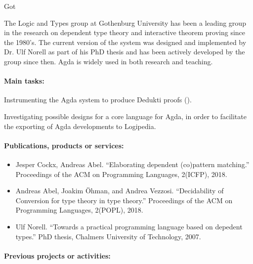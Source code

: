 \begin{sitedescription}{Got}

The Logic and Types group at Gothenburg University has been a leading group
in the research on dependent type theory and interactive theorem proving
since the 1980's. The current version of the system was designed and
implemented by Dr. Ulf Norell as part of his PhD thesis and has been
actively developed by the group since then. Agda is widely used in both
research and teaching.

\paragraph{Main tasks:}

\begin{compactitem}
\item Instrumenting the Agda system to produce Dedukti proofs
  ().
\item Investigating possible designs for a core language for Agda, in
  order to facilitate the exporting of Agda developments to Logipedia.
\end{compactitem}

\paragraph{Publications, products or services:}
\begin{itemize}
  \item Jesper Cockx, Andreas Abel. ``Elaborating dependent
  (co)pattern matching.'' Proceedings of the ACM on Programming
  Languages, 2(ICFP), 2018.
  \item Andreas Abel, Joakim \"Ohman, and Andrea Vezzosi. ``Decidability of
  Conversion for type theory in type theory.'' Proceedings of the ACM on Programming
  Languages, 2(POPL), 2018.
  \item Ulf Norell. ``Towards a practical programming language based on
  depedent types.'' PhD thesis, Chalmers University of Technology, 2007.
\end{itemize}

\paragraph{Previous projects or activities:}


\end{sitedescription}
